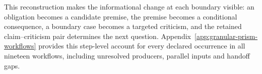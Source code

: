 This reconstruction makes the informational change at each boundary visible:
an obligation becomes a candidate premise, the premise becomes a conditional
consequence, a boundary case becomes a targeted criticism, and the retained
claim--criticism pair determines the next question. Appendix~\ref{app:granular-prism-workflows}
provides this step-level account for every declared occurrence in all nineteen
workflows, including unresolved producers, parallel inputs and handoff gaps.
